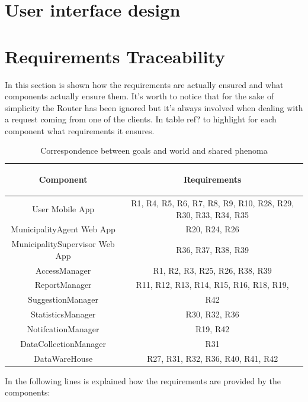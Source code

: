 \documentclass[a4paper]{report}
\begin{document}
\chapter{User interface design}

\chapter{Requirements Traceability}

In this section is shown how the requirements are actually ensured and what components actually ensure them. It's worth to notice that for the sake of simplicity the Router has been ignored but it's always involved when dealing with a request coming from one of the clients. 
In table ref? to highlight for each component what requirements it ensures.
\begin{table}[H]  
  \centering
  \begin{tabular}{|c|c|}
    \cline{1-2}
   	\rule{0pt}{10pt} 
   	\begin{large}
    \textbf{Component} 
    \end{large}&\begin{large}
    \textbf{Requirements} 
    \end{large}\\  \hline
    User Mobile App &  R1, R4, R5, R6, R7, R8, R9, R10, R28, R29, R30, R33, R34, R35 \\ \hline
    MunicipalityAgent Web App & R20, R24, R26 \\ \hline
    MunicipalitySupervisor Web App & R36, R37, R38, R39 \\ \hline
    AccessManager & R1, R2, R3, R25, R26, R38, R39 \\ \hline
    ReportManager & R11, R12, R13, R14, R15, R16, R18, R19, \\ \hline
    SuggestionManager & R42 \\ \hline
    StatisticsManager & R30, R32, R36 \\ \hline
    NotifcationManager & R19, R42 \\ \hline
    DataCollectionManager & R31 \\ \hline
    DataWareHouse & R27, R31, R32, R36, R40, R41, R42 \\ \hline
    
  \end{tabular}
  \caption{Correspondence between goals and world and shared phenoma}
\end{table}
In the following lines is explained how the requirements are provided by the components:
\end{document}
